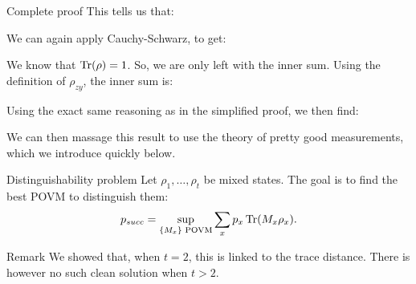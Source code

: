 \documentclass[a4paper]{article}
\begin{document}
\begin{parag}{}
\begin{subparag}{Complete proof}
        This tells us that: 
        
        We can again apply Cauchy-Schwarz, to get: 
        
        We know that $\Tr\left(\rho\right) = 1$. So, we are only left with the inner sum. Using the definition of $\rho_{zy}$, the inner sum is: 

        Using the exact same reasoning as in the simplified proof, we then find:

        We can then massage this result to use the theory of pretty good measurements, which we introduce quickly below.
    \end{subparag}
\end{parag}

\begin{parag}{Distinguishability problem}
    Let $\rho_1, \ldots, \rho_t$ be mixed states. The goal is to find the best POVM to distinguish them: 
    \[p_{succ} = \sup_{\left\{M_x\right\} \text{ POVM}} \sum_{x} p_x \Tr\left(M_x \rho_x\right).\]
    
    \begin{subparag}{Remark}
        We showed that, when $t = 2$, this is linked to the trace distance. There is however no such clean solution when $t > 2$.
    \end{subparag}
\end{parag}
\end{document}
